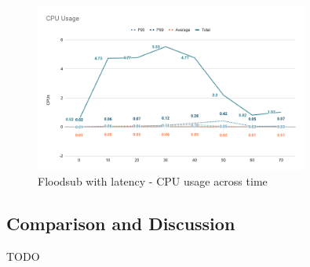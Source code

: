 \begin{figure}[!htb]
  \centering
  \includegraphics[width=0.8\textwidth]{img/graph-floodsub-cpu.png}
  \caption{Floodsub with latency - CPU usage across time}
  \label{fig:graph-floodsub-latency-cpu}
\end{figure}

\subsection{Comparison and Discussion}\label{subsec:comparison}

TODO
